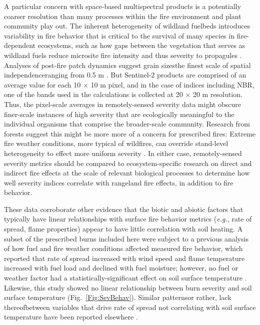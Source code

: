 \documentclass[fire,article,submit,oneauthor,pdftex]{Definitions/mdpi}
\begin{document}
A particular concern with space-based multispectral products is a potentially coarser resolution than many processes within the fire environment and plant community play out. 
The inherent heterogeneity of wildland fuelbeds introduces variability in fire behavior that is critical to the survival of many species in fire-dependent ecosystems, such as how gaps between the vegetation that serves as wildland fuels reduce microsite fire intensity and thus severity to propagules \cite{daibes2018, atchley2021}. 
Analyses of post-fire patch dynamics suggest grain sizes\textemdash the finest scale of spatial independence\textemdash ranging from 0.5 m \cite{lamont1993, gimeno-garcia2004, pereira2013, gongalsky2016, moore2021}. 
But Sentinel-2 products are comprised of an average value for each 10 $\times$ 10 m pixel, and in the case of indices including NBR, one of the bands used in the calculations is collected at  20 $\times$ 20 m resolution. 
Thus, the pixel-scale averages in remotely-sensed severity data might obscure finer-scale instances of high severity that are ecologically meaningful to the individual organisms that comprise the broader-scale community. 
Research from forests suggest this might be more more of a concern for prescribed fires: Extreme fire weather conditions, more typical of wildfires, can override stand-level heterogeneity to effect more uniform severity \cite{romme2006, mcfarland2025}. 
In either case, remotely-sensed severity metrics should be compared to ecosystem-specific research on direct and indirect fire effects at the scale of relevant biological processes to determine how well severity indices correlate with rangeland fire effects, in addition to fire behavior. 

These data corroborate other evidence that the biotic and abiotic factors that typically have linear relationships with surface fire behavior metrics (\emph{e.g.}, rate of spread, flame properties) appear to have little correlation with soil heating. 
A subset of the prescribed burns included here were subject to a previous analysis of how fuel and fire weather conditions affected measured fire behavior, which reported that rate of spread increased with wind speed and flame temperature increased with fuel load and declined with fuel moisture; however, no fuel or weather factor had a statistically-significant effect on soil surface temperature \cite{mcgranahan2023}.
Likewise, this study showed no linear relationship between burn severity and soil surface temperature (Fig.~\ref{Fig:SevBehav}).
Similar patterns\textemdash or rather, lack thereof\textemdash between variables that drive rate of spread not correlating with soil surface temperature have been reported elsewhere \cite{gimeno-garcia2004}. 
\end{document}
